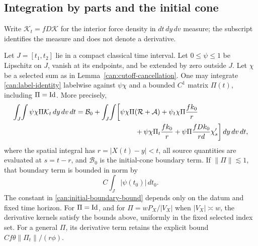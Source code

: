 \subsection{Integration by parts and the initial cone}

Write $\mathcal K_t=fD\mathcal K$ for the interior force density in
$dt\,dy\,dv$ measure; the subscript identifies the measure and does not
denote a derivative.

\begin{proposition}\label{can:weighted-formula}
Let $J=[t_1,t_2]$ lie in a compact classical time interval. Let
$0\leq\psi\leq1$ be Lipschitz on $J$, vanish at its endpoints, and be
extended by zero outside $J$. Let $\chi$ be a selected sum as in
Lemma~\ref{can:cutoff-cancellation}. One may integrate
\eqref{can:label-identity} labelwise against $\psi\chi$ and a bounded
$C^1$ matrix $\Pi(t)$, including $\Pi=\mathrm{Id}$. More precisely,
\begin{align}\label{can:weighted-terms}
 \int_J\!\int\psi\chi\Pi\mathcal K_t\,dy\,dv\,dt
 ={}&\mathcal B_0+\int_J\!\int
 \biggl[\psi\chi\Pi(\mathcal R+\mathcal A)
       +\psi_t\chi\Pi\frac{fk_0}{r}\notag\\
 &\hspace{25mm}+\psi\chi\Pi_t\frac{fk_0}{r}
       +\psi\Pi\frac{fDk_0}{rd}\chi'_s\biggr]\,dy\,dv\,dt,
\end{align}
where the spatial integral has $r=|X(t)-y|<t$, all source quantities are
evaluated at $s=t-r$, and $\mathcal B_0$ is the initial-cone boundary term.
If $\|\Pi\|\lesssim1$, that
boundary term is bounded in norm by
\begin{equation}\label{can:initial-boundary-bound}
 C\int_J|\psi(t_0)|\,dt_0.
\end{equation}
The constant in \eqref{can:initial-boundary-bound} depends only on the
datum and fixed time horizon. For $\Pi=\mathrm{Id}$, and for
$\Pi=wP_X/|V_X|$ when $|V_X|\asymp w$, the derivative kernels satisfy
the bounds above, uniformly in the fixed selected index set. For a general
$\Pi$, its derivative term retains the explicit bound
$Cf\theta\|\Pi_t\|/(r\phi)$.
\end{proposition}


